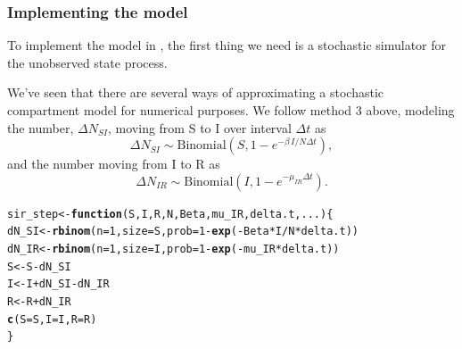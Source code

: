 \documentclass{beamer}\usepackage[]{graphicx}\usepackage[]{color}
\makeatletter
\newcommand{\hlnum}[1]{\textcolor[rgb]{0.686,0.059,0.569}{#1}}%
\newcommand{\hlopt}[1]{\textcolor[rgb]{0,0,0}{#1}}%
\newcommand{\hlstd}[1]{\textcolor[rgb]{0.345,0.345,0.345}{#1}}%
\newcommand{\hlkwa}[1]{\textcolor[rgb]{0.161,0.373,0.58}{\textbf{#1}}}%
\newcommand{\hlkwb}[1]{\textcolor[rgb]{0.69,0.353,0.396}{#1}}%
\newcommand{\hlkwc}[1]{\textcolor[rgb]{0.333,0.667,0.333}{#1}}%
\newcommand{\hlkwd}[1]{\textcolor[rgb]{0.737,0.353,0.396}{\textbf{#1}}}%
\newenvironment{kframe}{%
 \def\at@end@of@kframe{}%
 \ifinner\ifhmode%
  \def\at@end@of@kframe{\end{minipage}}%
  \begin{minipage}{\columnwidth}%
 \fi\fi%
 \def\FrameCommand##1{\hskip\@totalleftmargin \hskip-\fboxsep
 \colorbox{shadecolor}{##1}\hskip-\fboxsep
     \hskip-\linewidth \hskip-\@totalleftmargin \hskip\columnwidth}%
 \MakeFramed {\advance\hsize-\width
   \@totalleftmargin\z@ \linewidth\hsize
   \@setminipage}}%
 {\par\unskip\endMakeFramed%
 \at@end@of@kframe}
\newenvironment{knitrout}{}{} %
\newcommand\dist[2]{\mathrm{#1}\left(#2\right)}
\newcommand\dlta{\Delta}
\makeatother
\begin{document}

\begin{frame}[fragile] 

\frametitle{Implementing the model}

\bi

\item To implement the model in , the first thing we need is a stochastic simulator for the unobserved state process.

\item We've seen that there are several ways of approximating a stochastic compartment model for numerical purposes. We follow method 3 above, modeling the number, $\dlta{N_{SI}}$, moving from S to I over interval $\dlta{t}$ as
$$\dlta{N_{SI}} \sim \dist{Binomial}{S,1-e^{-\beta\,I/N\dlta{t}}},$$
and the number moving from I to R as
$$\dlta{N_{IR}} \sim \dist{Binomial}{I,1-e^{-\mu_{IR}\dlta{t}}}.$$

\ei

\begin{knitrout}\small
{}\color{fgcolor}\begin{kframe}
\begin{alltt}
\hlstd{sir_step} \hlkwb{<-} \hlkwa{function} \hlstd{(}\hlkwc{S}\hlstd{,} \hlkwc{I}\hlstd{,} \hlkwc{R}\hlstd{,} \hlkwc{N}\hlstd{,} \hlkwc{Beta}\hlstd{,} \hlkwc{mu_IR}\hlstd{,} \hlkwc{delta.t}\hlstd{,} \hlkwc{...}\hlstd{) \{}
  \hlstd{dN_SI} \hlkwb{<-} \hlkwd{rbinom}\hlstd{(}\hlkwc{n}\hlstd{=}\hlnum{1}\hlstd{,}\hlkwc{size}\hlstd{=S,}\hlkwc{prob}\hlstd{=}\hlnum{1}\hlopt{-}\hlkwd{exp}\hlstd{(}\hlopt{-}\hlstd{Beta}\hlopt{*}\hlstd{I}\hlopt{/}\hlstd{N}\hlopt{*}\hlstd{delta.t))}
  \hlstd{dN_IR} \hlkwb{<-} \hlkwd{rbinom}\hlstd{(}\hlkwc{n}\hlstd{=}\hlnum{1}\hlstd{,}\hlkwc{size}\hlstd{=I,}\hlkwc{prob}\hlstd{=}\hlnum{1}\hlopt{-}\hlkwd{exp}\hlstd{(}\hlopt{-}\hlstd{mu_IR}\hlopt{*}\hlstd{delta.t))}
  \hlstd{S} \hlkwb{<-} \hlstd{S} \hlopt{-} \hlstd{dN_SI}
  \hlstd{I} \hlkwb{<-} \hlstd{I} \hlopt{+} \hlstd{dN_SI} \hlopt{-} \hlstd{dN_IR}
  \hlstd{R} \hlkwb{<-} \hlstd{R} \hlopt{+} \hlstd{dN_IR}
  \hlkwd{c}\hlstd{(}\hlkwc{S} \hlstd{= S,} \hlkwc{I} \hlstd{= I,} \hlkwc{R} \hlstd{= R)}
\hlstd{\}}
\end{alltt}
\end{kframe}
\end{knitrout}

\end{frame}
\end{document}
